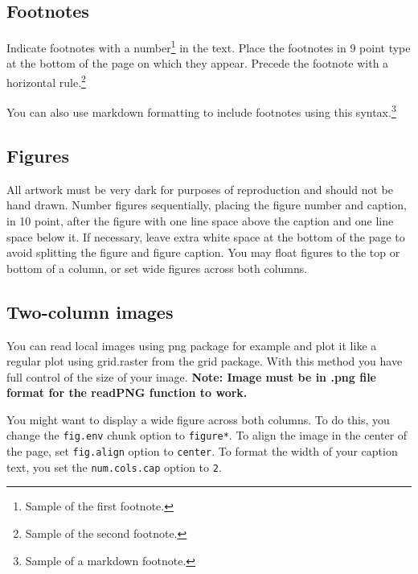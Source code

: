 \documentclass[10pt, letterpaper]{article}
\begin{document}
\subsection{Footnotes}\label{footnotes}

Indicate footnotes with a number\footnote{Sample of the first
footnote.} in the text. Place the footnotes in 9 point type at the
bottom of the page on which they appear. Precede the footnote with a
horizontal rule.\footnote{Sample of the second footnote.}

You can also use markdown formatting to include footnotes using this
syntax.\footnote{Sample of a markdown footnote.}

\subsection{Figures}\label{figures}

All artwork must be very dark for purposes of reproduction and should
not be hand drawn. Number figures sequentially, placing the figure
number and caption, in 10 point, after the figure with one line space
above the caption and one line space below it. If necessary, leave extra
white space at the bottom of the page to avoid splitting the figure and
figure caption. You may float figures to the top or bottom of a column,
or set wide figures across both columns.

\subsection{Two-column images}\label{two-column-images}

You can read local images using png package for example and plot it like
a regular plot using grid.raster from the grid package. With this method
you have full control of the size of your image. \textbf{Note: Image
must be in .png file format for the readPNG function to work.}

You might want to display a wide figure across both columns. To do this,
you change the \texttt{fig.env} chunk option to \texttt{figure*}. To
align the image in the center of the page, set \texttt{fig.align} option
to \texttt{center}. To format the width of your caption text, you set
the \texttt{num.cols.cap} option to \texttt{2}.
\end{document}
